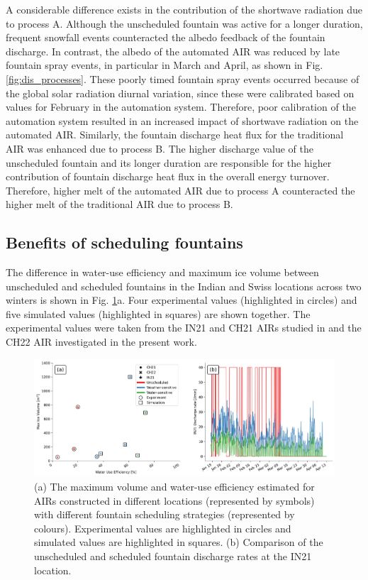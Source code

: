\documentclass[tc, manuscript]{copernicus}
\begin{document}
A considerable difference exists in the contribution of the shortwave radiation due to process A. Although the unscheduled fountain was active for a longer duration, frequent snowfall events
counteracted the albedo feedback of the fountain discharge. In contrast, the albedo of the automated AIR was
reduced by late fountain spray events, in particular in March and April, as shown in Fig.
\ref{fig:dis_processes}. These poorly timed fountain spray events occurred because of the global solar radiation
diurnal variation, since these were calibrated based on values for February in the automation system.
Therefore, poor calibration of the automation system resulted in an increased impact of shortwave radiation on
the automated AIR. Similarly, the fountain discharge heat flux for the traditional AIR was enhanced due to
process B. The higher discharge value of the unscheduled fountain and its longer duration are responsible
for the higher contribution of fountain discharge heat flux in the overall energy turnover. Therefore, higher
melt of the automated AIR due to process A counteracted the higher melt of the traditional AIR due to process B.

\subsection{Benefits of scheduling fountains}

The difference in water-use efficiency and maximum ice volume between unscheduled and scheduled fountains in the Indian and Swiss
locations across two winters is shown in Fig. \ref{fig:wue}a. Four experimental values (highlighted in
circles) and five simulated values (highlighted in squares) are shown together.  The experimental values were
taken from the IN21 and CH21 AIRs studied in \citet{balasubramanianInfluenceMeteorologicalConditions2022} and
the CH22 AIR investigated in the present work. 

\begin{figure}[htb]
\includegraphics[width=\textwidth]{Figures/wue.png}

\caption{(a) The maximum volume and water-use efficiency estimated for AIRs constructed in different locations
(represented by symbols) with different fountain scheduling strategies (represented by colours). Experimental
values are highlighted in circles and simulated values are highlighted in squares. (b) Comparison of
the unscheduled and scheduled fountain discharge rates at the IN21 location.}

\label{fig:wue}
\end{figure}
\end{document}
